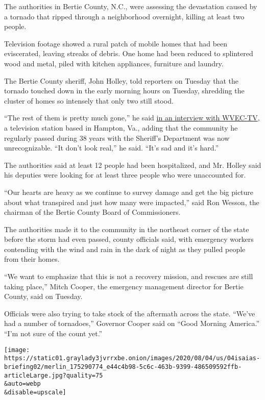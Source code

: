The authorities in Bertie County, N.C., were assessing the devastation
caused by a tornado that ripped through a neighborhood overnight,
killing at least two people.

Television footage showed a rural patch of mobile homes that had been
eviscerated, leaving streaks of debris. One home had been reduced to
splintered wood and metal, piled with kitchen appliances, furniture and
laundry.

The Bertie County sheriff, John Holley, told reporters on Tuesday that
the tornado touched down in the early morning hours on Tuesday,
shredding the cluster of homes so intensely that only two still stood.

``The rest of them is pretty much gone,'' he said
\href{https://www.13newsnow.com/video/news/local/north-carolina/bertie-county-sheriff-john-holley-talks-about-fatality-in-north-carolina/291-99306d30-d640-4e9a-97fa-0221d565f5df}{in
an interview with WVEC-TV}, a television station based in Hampton, Va.,
adding that the community he regularly passed during 38 years with the
Sheriff's Department was now unrecognizable. ``It don't look real,'' he
said. ``It's sad and it's hard.''

The authorities said at least 12 people had been hospitalized, and Mr.
Holley said his deputies were looking for at least three people who were
unaccounted for.

``Our hearts are heavy as we continue to survey damage and get the big
picture about what transpired and just how many were impacted,'' said
Ron Wesson, the chairman of the Bertie County Board of Commissioners.

The authorities made it to the community in the northeast corner of the
state before the storm had even passed, county officials said, with
emergency workers contending with the wind and rain in the dark of night
as they pulled people from their homes.

``We want to emphasize that this is not a recovery mission, and rescues
are still taking place,'' Mitch Cooper, the emergency management
director for Bertie County, said on Tuesday.

Officials were also trying to take stock of the aftermath across the
state. ``We've had a number of tornadoes,'' Governor Cooper said on
``Good Morning America.'' ``I'm not sure of the count yet.''

\texttt{[image: https://static01.graylady3jvrrxbe.onion/images/2020/08/04/us/04isaias-briefing02/merlin\_175290774\_e44c4b98-5c6c-463b-9399-486509592ffb-articleLarge.jpg?quality=75\\\&auto=webp\\\&disable=upscale]}

